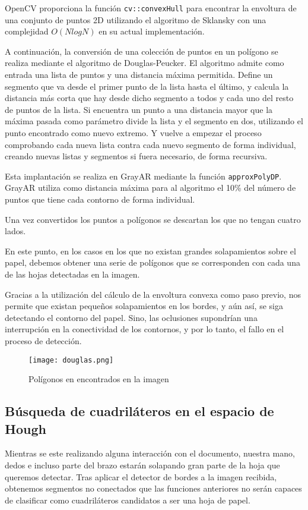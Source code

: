 OpenCV proporciona la función \texttt{cv::convexHull} para encontrar la envoltura de una conjunto de puntos 2D utilizando el algoritmo de Sklansky con una complejidad $O(N log N)$ en su actual implementación.

A continuación, la conversión de una colección de puntos en un polígono se realiza mediante el algoritmo de Douglas-Peucker. El algoritmo admite como entrada una lista de puntos y una distancia máxima permitida. Define un segmento que va desde el primer punto de la lista hasta el último, y calcula la distancia más corta que hay desde dicho segmento a todos y cada uno del resto de puntos de la lista. Si encuentra un punto a una distancia mayor que la máxima pasada como parámetro divide la lista y el segmento en dos, utilizando el punto encontrado como nuevo extremo. Y vuelve a empezar el proceso comprobando cada nueva lista contra cada nuevo segmento de forma individual, creando nuevas listas y segmentos si fuera necesario, de forma recursiva.

Esta implantación se realiza en GrayAR mediante la función \texttt{approxPolyDP}. GrayAR utiliza como distancia máxima para al algoritmo el 10\% del número de puntos que tiene cada contorno de forma individual.

Una vez convertidos los puntos a polígonos se descartan los que no tengan cuatro lados. 

En este punto, en los casos en los que no existan grandes solapamientos sobre el papel, debemos obtener una serie de polígonos que se corresponden con cada una de las hojas detectadas en la imagen.

Gracias a la utilización del cálculo de la envoltura convexa como paso previo, nos permite que existan pequeños solapamientos en los bordes, y aún así, se siga detectando el contorno del papel. Sino, las oclusiones supondrían una interrupción en la conectividad de los contornos, y por lo tanto, el fallo en el proceso de detección.

\begin{figure}[h] 
  \centering
  \texttt{[image: douglas.png]}
  \caption{Polígonos en encontrados en la imagen}
  \label{fig:douglas}
\end{figure}

\subsection{Búsqueda de cuadriláteros en el espacio de Hough}
Mientras se este realizando alguna interacción con el documento, nuestra mano, dedos e incluso parte del brazo estarán solapando gran parte de la hoja que queremos detectar. Tras aplicar el detector de bordes a la imagen recibida, obtenemos segmentos no conectados que las funciones anteriores no serán capaces de clasificar como cuadriláteros candidatos a ser una hoja de papel.

